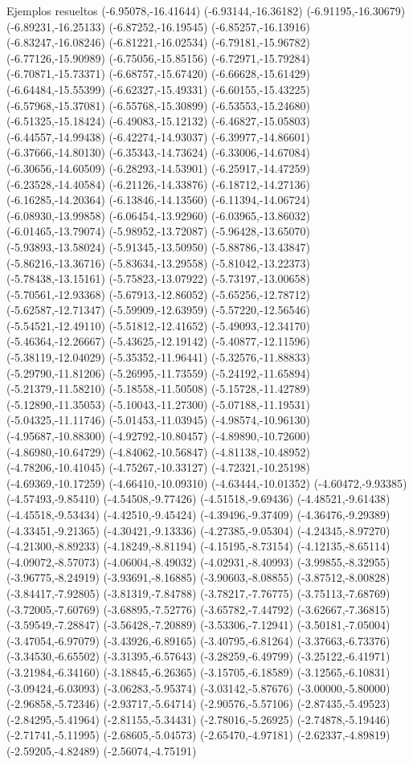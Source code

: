\documentclass[11pt,a4paper]{article}
\begin{document}
\begin{fmex}{Ejemplos resueltos}
(-6.95078,-16.41644) (-6.93144,-16.36182) (-6.91195,-16.30679) (-6.89231,-16.25133) (-6.87252,-16.19545) (-6.85257,-16.13916) (-6.83247,-16.08246) (-6.81221,-16.02534) (-6.79181,-15.96782) (-6.77126,-15.90989) (-6.75056,-15.85156) (-6.72971,-15.79284) (-6.70871,-15.73371) (-6.68757,-15.67420) (-6.66628,-15.61429) (-6.64484,-15.55399) (-6.62327,-15.49331) (-6.60155,-15.43225) (-6.57968,-15.37081) (-6.55768,-15.30899) (-6.53553,-15.24680) (-6.51325,-15.18424) (-6.49083,-15.12132) (-6.46827,-15.05803) (-6.44557,-14.99438) (-6.42274,-14.93037) (-6.39977,-14.86601) (-6.37666,-14.80130) (-6.35343,-14.73624) (-6.33006,-14.67084) (-6.30656,-14.60509) (-6.28293,-14.53901) (-6.25917,-14.47259) (-6.23528,-14.40584) (-6.21126,-14.33876) (-6.18712,-14.27136) (-6.16285,-14.20364) (-6.13846,-14.13560) (-6.11394,-14.06724) (-6.08930,-13.99858) (-6.06454,-13.92960) (-6.03965,-13.86032) (-6.01465,-13.79074) (-5.98952,-13.72087) (-5.96428,-13.65070) (-5.93893,-13.58024) (-5.91345,-13.50950) (-5.88786,-13.43847) (-5.86216,-13.36716) (-5.83634,-13.29558) (-5.81042,-13.22373) (-5.78438,-13.15161) (-5.75823,-13.07922) (-5.73197,-13.00658) (-5.70561,-12.93368) (-5.67913,-12.86052) (-5.65256,-12.78712) (-5.62587,-12.71347) (-5.59909,-12.63959) (-5.57220,-12.56546) (-5.54521,-12.49110) (-5.51812,-12.41652) (-5.49093,-12.34170) (-5.46364,-12.26667) (-5.43625,-12.19142) (-5.40877,-12.11596) (-5.38119,-12.04029) (-5.35352,-11.96441) (-5.32576,-11.88833) (-5.29790,-11.81206) (-5.26995,-11.73559) (-5.24192,-11.65894) (-5.21379,-11.58210) (-5.18558,-11.50508) (-5.15728,-11.42789) (-5.12890,-11.35053) (-5.10043,-11.27300) (-5.07188,-11.19531) (-5.04325,-11.11746) (-5.01453,-11.03945) (-4.98574,-10.96130) (-4.95687,-10.88300) (-4.92792,-10.80457) (-4.89890,-10.72600) (-4.86980,-10.64729) (-4.84062,-10.56847) (-4.81138,-10.48952) (-4.78206,-10.41045) (-4.75267,-10.33127) (-4.72321,-10.25198) (-4.69369,-10.17259) (-4.66410,-10.09310) (-4.63444,-10.01352) (-4.60472,-9.93385) (-4.57493,-9.85410) (-4.54508,-9.77426) (-4.51518,-9.69436) (-4.48521,-9.61438) (-4.45518,-9.53434) (-4.42510,-9.45424) (-4.39496,-9.37409) (-4.36476,-9.29389) (-4.33451,-9.21365) (-4.30421,-9.13336) (-4.27385,-9.05304) (-4.24345,-8.97270) (-4.21300,-8.89233) (-4.18249,-8.81194) (-4.15195,-8.73154) (-4.12135,-8.65114) (-4.09072,-8.57073) (-4.06004,-8.49032) (-4.02931,-8.40993) (-3.99855,-8.32955) (-3.96775,-8.24919) (-3.93691,-8.16885) (-3.90603,-8.08855) (-3.87512,-8.00828) (-3.84417,-7.92805) (-3.81319,-7.84788) (-3.78217,-7.76775) (-3.75113,-7.68769) (-3.72005,-7.60769) (-3.68895,-7.52776) (-3.65782,-7.44792) (-3.62667,-7.36815) (-3.59549,-7.28847) (-3.56428,-7.20889) (-3.53306,-7.12941) (-3.50181,-7.05004) (-3.47054,-6.97079) (-3.43926,-6.89165) (-3.40795,-6.81264) (-3.37663,-6.73376) (-3.34530,-6.65502) (-3.31395,-6.57643) (-3.28259,-6.49799) (-3.25122,-6.41971) (-3.21984,-6.34160) (-3.18845,-6.26365) (-3.15705,-6.18589) (-3.12565,-6.10831) (-3.09424,-6.03093) (-3.06283,-5.95374) (-3.03142,-5.87676) (-3.00000,-5.80000) (-2.96858,-5.72346) (-2.93717,-5.64714) (-2.90576,-5.57106) (-2.87435,-5.49523) (-2.84295,-5.41964) (-2.81155,-5.34431) (-2.78016,-5.26925) (-2.74878,-5.19446) (-2.71741,-5.11995) (-2.68605,-5.04573) (-2.65470,-4.97181) (-2.62337,-4.89819) (-2.59205,-4.82489) (-2.56074,-4.75191) 
\end{fmex}
\end{document}
